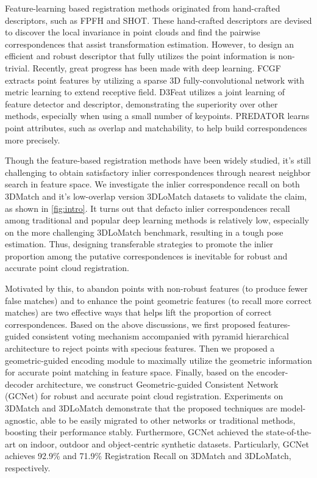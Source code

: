 \documentclass[10pt,twocolumn,letterpaper]{article}
\begin{document}
Feature-learning based registration methods originated from hand-crafted descriptors, such as FPFH\cite{rusu2008aligning,rusu2009fast} and SHOT\cite{tombari2010unique}. These hand-crafted descriptors are devised to discover the local invariance in point clouds and find the pairwise correspondences that assist transformation estimation. However, to design an efficient and robust descriptor that fully utilizes the point information is non-trivial. Recently, great progress has been made with deep learning\cite{deng2018ppfnet,deng2018ppf,gojcic2019perfect,choy2019fully,bai2020d3feat,huang2021predator,ao2021spinnet,yu2021cofinet}. FCGF\cite{choy2019fully} extracts point features by utilizing a sparse 3D fully-convolutional network with metric learning to extend receptive field. D3Feat\cite{bai2020d3feat} utilizes a joint learning of feature detector and descriptor, demonstrating the superiority over other methods,  especially when using a small number of keypoints. PREDATOR\cite{huang2021predator} learns point attributes, such as overlap and matchability, to help build correspondences more precisely. 

Though the feature-based registration methods have been widely studied, it's still challenging to obtain satisfactory inlier correspondences  through nearest neighbor search in feature space.
We investigate the inlier correspondence recall on both 3DMatch and it's low-overlap version 3DLoMatch datasets to validate the claim, as shown in \cref{fig:intro}. It turns out that defacto inlier correspondences recall among traditional and popular deep learning methods is relatively low, especially on the more challenging 3DLoMatch benchmark, resulting in a tough pose estimation. 
Thus, designing transferable strategies to promote the inlier proportion among the putative correspondences is  inevitable for robust and accurate point cloud registration.

Motivated by this, to abandon points with non-robust features (to produce fewer false matches) and to enhance the point geometric features (to recall more correct matches) are two effective ways that helps lift the proportion of correct correspondences. Based on the above discussions, we first proposed features-guided consistent voting mechanism accompanied with pyramid hierarchical architecture to reject points with specious features. Then we proposed a geometric-guided encoding module to maximally utilize the geometric information for accurate point matching in feature space. Finally, based on the encoder-decoder architecture, we construct Geometric-guided Consistent Network (GCNet) for robust and accurate point cloud registration. Experiments on 3DMatch and 3DLoMatch demonstrate that the proposed techniques are model-agnostic, able to be easily migrated to other networks or traditional methods, boosting their performance stably. Furthermore, GCNet achieved the state-of-the-art on indoor, outdoor and object-centric synthetic datasets. Particularly, GCNet achieves 92.9\% and 71.9\% Registration Recall on 3DMatch and 3DLoMatch, respectively.
\end{document}
